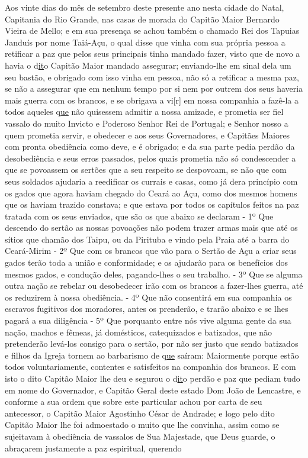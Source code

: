 \begin{refsection}
    Aos vinte dias do mês de setembro deste presente ano nesta cidade do Natal, Capitania do Rio Grande, nas casas de morada do Capitão Maior Bernardo Vieira de Mello; e em sua presença se achou também o chamado Rei dos Tapuias Janduís por nome Taiá-Açu, o qual disse que vinha com sua própria pessoa a retificar a paz que pelos seus principais tinha mandado fazer, visto que de novo a havia o d\underline{it}o Capitão Maior mandado assegurar; enviando-lhe em sinal dela um seu bastão, e obrigado com isso vinha em pessoa, não só a retificar a mesma paz, se não a assegurar que em nenhum tempo por si nem por outrem dos seus haveria mais guerra com os brancos, e se obrigava a vi[r] em nossa companhia a fazê-la a todos aqueles q\underline{ue} não quisessem admitir a nossa amizade, e prometia ser fiel vassalo do muito Invicto e Poderoso Senhor Rei de Portugal; e Senhor nosso a quem prometia servir, e obedecer e aos seus Governadores, e Capitães Maiores com pronta obediência como deve, e é obrigado; e da sua parte pedia perdão da desobediência e seus erros passados, pelos quais prometia não só condescender a que se povoassem os sertões que a seu respeito se despovoam, se não que com seus soldados ajudaria a reedificar os currais e casas, como já dera princípio com os gados que agora haviam chegado do Ceará ao Açu, como dos mesmos homens que os haviam trazido constava; e que estava por todos os capítulos feitos na paz tratada com os seus enviados, que são os que abaixo se declaram - 1º Que descendo do sertão as nossas povoações não podem trazer armas mais que até os sítios que chamão dos Taipu, ou da Pirituba e vindo pela Praia até a barra do Ceará-Mirim - 2º Que com os brancos que vão para o Sertão de Açu a criar seus gados terão toda a união e conformidade; e os ajudarão para os benefícios dos mesmos gados, e condução deles, pagando-lhes o seu trabalho. - 3º Que se alguma outra nação se rebelar ou desobedecer irão com os brancos a fazer-lhes guerra, até os reduzirem à nossa obediência. - 4º Que não consentirá em sua companhia os escravos fugitivos dos moradores, antes os prenderão, e trarão abaixo e se lhes pagará a sua diligência - 5º Que porquanto entre nós vive alguma gente da sua nação, machos e fêmeas, já domésticos, catequizados e batizados, que não pretenderão levá-los consigo para o sertão, por não ser justo que sendo batizados e filhos da Igreja tornem ao barbarismo de q\underline{ue} saíram: Maiormente porque estão todos voluntariamente, contentes e satisfeitos na companhia dos brancos. E com isto o dito Capitão Maior lhe deu e segurou o d\underline{it}o perdão e paz que pediam tudo em nome do Governador, e Capitão Geral deste estado Dom João de Lencastre, e conforme a sua ordem que sobre este particular achou por carta de seu antecessor, o Capitão Maior Agostinho César de Andrade; e logo pelo dito Capitão Maior lhe foi admoestado o muito que lhe convinha, assim como se sujeitavam à obediência de vassalos de Sua Majestade, que Deus guarde, o abraçarem justamente a paz espiritual, querendo 


\end{refsection}
